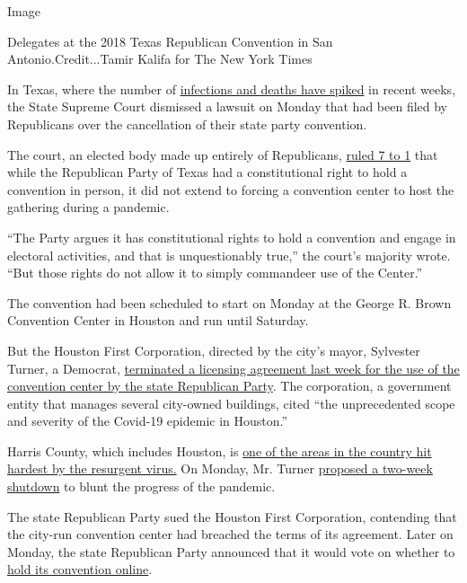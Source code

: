Image

Delegates at the 2018 Texas Republican Convention in San
Antonio.Credit...Tamir Kalifa for The New York Times

In Texas, where the number of
\href{https://www.nytimes.com/interactive/2020/us/texas-coronavirus-cases.html}{infections
and deaths have spiked} in recent weeks, the State Supreme Court
dismissed a lawsuit on Monday that had been filed by Republicans over
the cancellation of their state party convention.

The court, an elected body made up entirely of Republicans,
\href{https://www.txcourts.gov/media/1448816/200525.pdf}{ruled 7 to 1}
that while the Republican Party of Texas had a constitutional right to
hold a convention in person, it did not extend to forcing a convention
center to host the gathering during a pandemic.

``The Party argues it has constitutional rights to hold a convention and
engage in electoral activities, and that is unquestionably true,'' the
court's majority wrote. ``But those rights do not allow it to simply
commandeer use of the Center.''

The convention had been scheduled to start on Monday at the George R.
Brown Convention Center in Houston and run until Saturday.

But the Houston First Corporation, directed by the city's mayor,
Sylvester Turner, a Democrat,
\href{https://www.nytimes.com/2020/07/08/us/coronavirus-texas-republican-convention-gop.html}{terminated
a licensing agreement last week for the use of the convention center by
the state Republican Party}. The corporation, a government entity that
manages several city-owned buildings, cited ``the unprecedented scope
and severity of the Covid-19 epidemic in Houston.''

Harris County, which includes Houston, is
\href{https://www.nytimes.com/2020/07/13/upshot/coronavirus-response-fax-machines.html}{one
of the areas in the country hit hardest by the resurgent virus.} On
Monday, Mr. Turner
\href{https://twitter.com/SylvesterTurner/status/1282774971916464129}{proposed
a two-week shutdown} to blunt the progress of the pandemic.

The state Republican Party sued the Houston First Corporation,
contending that the city-run convention center had breached the terms of
its agreement. Later on Monday, the state Republican Party announced
that it would vote on whether to
\href{https://www.texasgop.org/republican-party-of-texas-holds-state-republican-executive-committee-to-convene-tonight-to-move-to-online-convention/}{hold
its convention online}.

